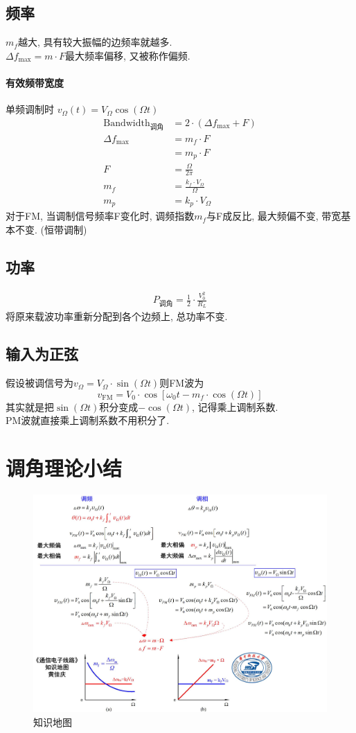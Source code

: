 \documentclass[a4paper]{report}
\begin{document}
\subsection{频率}
$m_f$越大, 具有较大振幅的边频率就越多. \\
$\Delta f_{\text{max}}=m\cdot F$最大频率偏移, 又被称作偏频. 
\paragraph{有效频带宽度} 单频调制时 $v_\Omega(t)=V_\Omega\cos(\Omega t)$
\begin{align*}
  \text{Bandwidth}_\text{调角}&=2\cdot (\Delta f_{\text{max}}+F)\\
  \Delta f_{\text{max}}&= m_f\cdot F\\
  &=m_p\cdot F\\
  F&=\frac{\Omega}{2\pi}\\
  m_f&=\frac{k_f\cdot V_\Omega}{\Omega}\\
  m_p&=k_p\cdot V_\Omega
\end{align*}
对于FM, 当调制信号频率F变化时, 调频指数$m_f$与F成反比, 最大频偏不变, 带宽基本不变. (恒带调制)
\subsection{功率}
\begin{align*}
  P_\text{调角}=\frac{1}{2}\cdot\frac{V_0^2}{R_L}
\end{align*}
将原来载波功率重新分配到各个边频上, 总功率不变. 
\subsection{输入为正弦}
假设被调信号为$v_\Omega=V_\Omega\cdot \sin(\Omega t)$则FM波为
$$v_\text{FM}=V_0\cdot \cos[\omega_0 t- m_f\cdot\cos(\Omega t)]$$
其实就是把$\sin(\Omega t)$积分变成$-\cos(\Omega t)$, 记得乘上调制系数. \\
PM波就直接乘上调制系数不用积分了. 
\section{调角理论小结}
\begin{figure}[H]
\centering
\includegraphics[width=\textwidth]{fm_map.jpg}
\caption{知识地图}
\end{figure}
\end{document}

